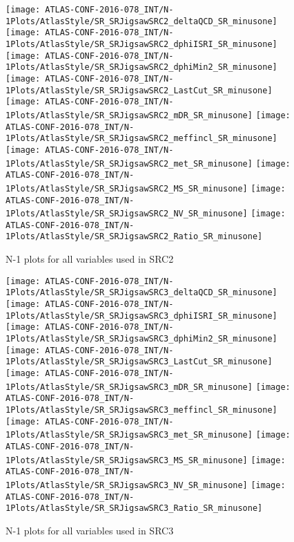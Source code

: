 \begin{figure}[tbp]
\begin{center}
\texttt{[image: ATLAS-CONF-2016-078\_INT/N-1Plots/AtlasStyle/SR\_SRJigsawSRC2\_deltaQCD\_SR\_minusone]}
\texttt{[image: ATLAS-CONF-2016-078\_INT/N-1Plots/AtlasStyle/SR\_SRJigsawSRC2\_dphiISRI\_SR\_minusone]}
\texttt{[image: ATLAS-CONF-2016-078\_INT/N-1Plots/AtlasStyle/SR\_SRJigsawSRC2\_dphiMin2\_SR\_minusone]}
\texttt{[image: ATLAS-CONF-2016-078\_INT/N-1Plots/AtlasStyle/SR\_SRJigsawSRC2\_LastCut\_SR\_minusone]}
\texttt{[image: ATLAS-CONF-2016-078\_INT/N-1Plots/AtlasStyle/SR\_SRJigsawSRC2\_mDR\_SR\_minusone]}
\texttt{[image: ATLAS-CONF-2016-078\_INT/N-1Plots/AtlasStyle/SR\_SRJigsawSRC2\_meffincl\_SR\_minusone]}
\texttt{[image: ATLAS-CONF-2016-078\_INT/N-1Plots/AtlasStyle/SR\_SRJigsawSRC2\_met\_SR\_minusone]}
\texttt{[image: ATLAS-CONF-2016-078\_INT/N-1Plots/AtlasStyle/SR\_SRJigsawSRC2\_MS\_SR\_minusone]}
\texttt{[image: ATLAS-CONF-2016-078\_INT/N-1Plots/AtlasStyle/SR\_SRJigsawSRC2\_NV\_SR\_minusone]}
\texttt{[image: ATLAS-CONF-2016-078\_INT/N-1Plots/AtlasStyle/SR\_SRJigsawSRC2\_Ratio\_SR\_minusone]}
\end{center}
\caption{N-1 plots for all variables used in SRC2}
\label{fig:SR_SRJigsawSRC1_met_SR_minusone}
\end{figure}

\clearpage
\begin{figure}[tbp]
\begin{center}
\texttt{[image: ATLAS-CONF-2016-078\_INT/N-1Plots/AtlasStyle/SR\_SRJigsawSRC3\_deltaQCD\_SR\_minusone]}
\texttt{[image: ATLAS-CONF-2016-078\_INT/N-1Plots/AtlasStyle/SR\_SRJigsawSRC3\_dphiISRI\_SR\_minusone]}
\texttt{[image: ATLAS-CONF-2016-078\_INT/N-1Plots/AtlasStyle/SR\_SRJigsawSRC3\_dphiMin2\_SR\_minusone]}
\texttt{[image: ATLAS-CONF-2016-078\_INT/N-1Plots/AtlasStyle/SR\_SRJigsawSRC3\_LastCut\_SR\_minusone]}
\texttt{[image: ATLAS-CONF-2016-078\_INT/N-1Plots/AtlasStyle/SR\_SRJigsawSRC3\_mDR\_SR\_minusone]}
\texttt{[image: ATLAS-CONF-2016-078\_INT/N-1Plots/AtlasStyle/SR\_SRJigsawSRC3\_meffincl\_SR\_minusone]}
\texttt{[image: ATLAS-CONF-2016-078\_INT/N-1Plots/AtlasStyle/SR\_SRJigsawSRC3\_met\_SR\_minusone]}
\texttt{[image: ATLAS-CONF-2016-078\_INT/N-1Plots/AtlasStyle/SR\_SRJigsawSRC3\_MS\_SR\_minusone]}
\texttt{[image: ATLAS-CONF-2016-078\_INT/N-1Plots/AtlasStyle/SR\_SRJigsawSRC3\_NV\_SR\_minusone]}
\texttt{[image: ATLAS-CONF-2016-078\_INT/N-1Plots/AtlasStyle/SR\_SRJigsawSRC3\_Ratio\_SR\_minusone]}
\end{center}
\caption{N-1 plots for all variables used in SRC3}
\label{fig:SR_SRJigsawSRC2_NV_SR_minusone}
\end{figure}

